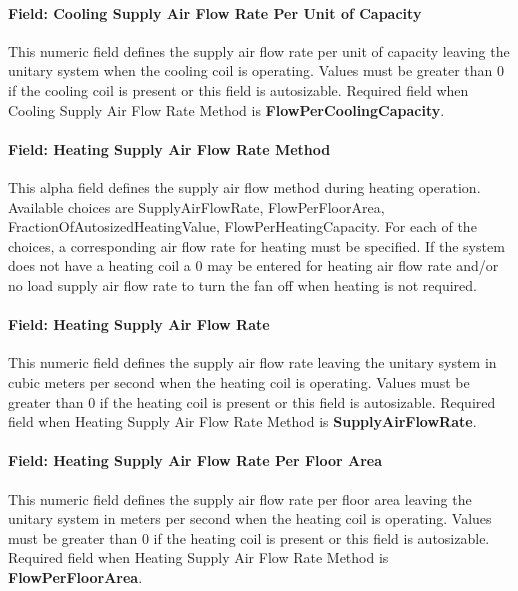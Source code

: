 \paragraph{Field: Cooling Supply Air Flow Rate Per Unit of Capacity}\label{field-cooling-supply-air-flow-rate-per-unit-of-capacity}

This numeric field defines the supply air flow rate per unit of capacity leaving the unitary system when the cooling coil is operating. Values must be greater than 0 if the cooling coil is present or this field is autosizable. Required field when Cooling Supply Air Flow Rate Method is \textbf{FlowPerCoolingCapacity}.

\paragraph{Field: Heating Supply Air Flow Rate Method}\label{field-heating-supply-air-flow-rate-method-000}

This alpha field defines the supply air flow method during heating operation. Available choices are SupplyAirFlowRate, FlowPerFloorArea, FractionOfAutosizedHeatingValue, FlowPerHeatingCapacity. For each of the choices, a corresponding air flow rate for heating must be specified. If the system does not have a heating coil a 0 may be entered for heating air flow rate and/or no load supply air flow rate to turn the fan off when heating is not required.

\paragraph{Field: Heating Supply Air Flow Rate}\label{field-heating-supply-air-flow-rate-001}

This numeric field defines the supply air flow rate leaving the unitary system in cubic meters per second when the heating coil is operating. Values must be greater than 0 if the heating coil is present or this field is autosizable. Required field when Heating Supply Air Flow Rate Method is \textbf{SupplyAirFlowRate}.

\paragraph{Field: Heating Supply Air Flow Rate Per Floor Area}\label{field-heating-supply-air-flow-rate-per-floor-area}

This numeric field defines the supply air flow rate per floor area leaving the unitary system in meters per second when the heating coil is operating. Values must be greater than 0 if the heating coil is present or this field is autosizable. Required field when Heating Supply Air Flow Rate Method is \textbf{FlowPerFloorArea}.

